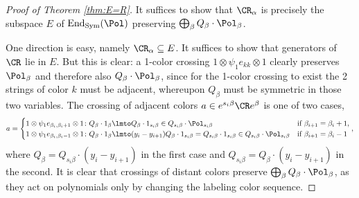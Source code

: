 \documentclass[11pt,reqno]{amsart}
\renewcommand{\te}[1]{\textrm{#1}}
\begin{document}


\begin{proof}[Proof of Theorem \ref{thm:E=R}]
    It suffices to show that $\CR_{\alpha}$ is precisely the subspace $E$ of $\End_{\Sym}(\Pol)$ preserving $\bigoplus_\beta Q_\beta\cdot\Pol_\beta$. 

    One direction is easy, namely $\CR_\alpha\subseteq E$. It suffices to show that generators of $\CR$ lie in $E$. But this is clear: a 1-color crossing $1\otimes \psi_1 e_{kk}\otimes 1$ clearly preserves $\Pol_\beta$ and therefore also $Q_\beta\cdot\Pol_\beta$, since for the 1-color crossing to exist the 2 strings of color $k$ must be adjacent, whereupon $Q_\beta$ must be symmetric in those two variables. The crossing of adjacent colors $a\in e^{s_i\beta}\CR e^\beta$ is one of two cases,
    \[a=\begin{cases}
        1\otimes \psi_1 e_{\beta_i,\beta_i+1}\otimes 1\colon Q_\beta\cdot 1_\beta\lmto Q_\beta\cdot 1_{s_i\beta}\in Q_{s_i\beta}\cdot \Pol_{s_i\beta}&\te{if }\beta_{i+1}=\beta_i+1,\\
        1\otimes \psi_1 e_{\beta_i,\beta_i-1}\otimes 1\colon Q_\beta\cdot 1_\beta\lmto (y_i-y_{i+1}) Q_\beta\cdot 1_{s_i\beta}=Q_{s_i\beta} \cdot 1_{s_i\beta}\in Q_{s_i\beta}\cdot \Pol_{s_i\beta}&\te{if }\beta_{i+1}=\beta_i-1
    \end{cases},\]
    where $Q_\beta=Q_{s_i\beta}\cdot (y_i-y_{i+1})$ in the first case and $Q_{s_i\beta}=Q_\beta\cdot (y_i-y_{i+1})$ in the second.
    It is clear that crossings of distant colors preserve $\bigoplus_\beta Q_\beta\cdot\Pol_\beta$, as they act on polynomials only by changing the labeling color sequence. 


\end{proof}
\end{document}
